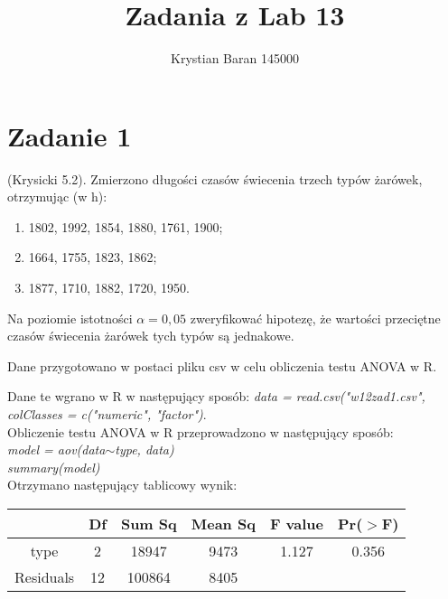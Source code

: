 \documentclass{article}
\author{Krystian Baran 145000}
\title{Zadania z Lab 13}
\begin{document}
\maketitle
\newpage

\tableofcontents
\newpage

\section{Zadanie 1}
(Krysicki 5.2). Zmierzono długości czasów świecenia trzech typów żarówek, otrzymując (w h):
\begin{enumerate}[label = dla typu \arabic*:]
\item 1802, 1992, 1854, 1880, 1761, 1900;
\item 1664, 1755, 1823, 1862;
\item 1877, 1710, 1882, 1720, 1950.
\end{enumerate}
Na poziomie istotności $\alpha=0,05$ zweryfikować hipotezę, że wartości przeciętne czasów świecenia żarówek tych typów są jednakowe. \\ \par

Dane przygotowano w postaci pliku csv w celu obliczenia testu ANOVA w R.
\begin{center}
\end{center}

Dane te wgrano w R w następujący sposób: \textit{data = read.csv("w12zad1.csv", colClasses = c("numeric", "factor")}. \\
Obliczenie testu ANOVA w R przeprowadzono w następujący sposób: \\
\textit{model = aov(data$\sim$type, data)} \\
\textit{summary(model)} \\
Otrzymano następujący tablicowy wynik:

\begin{center} \begin{tabular}{|c|c|c|c|c|c|} \hline
& Df & Sum Sq & Mean Sq & F value & Pr($>$F) \\ \hline
type & 2 & 18947 & 9473 & 1.127 & 0.356 \\ \hline
Residuals & 12 & 100864 & 8405 & & \\ \hline
\end{tabular} \end{center}
\end{document}
